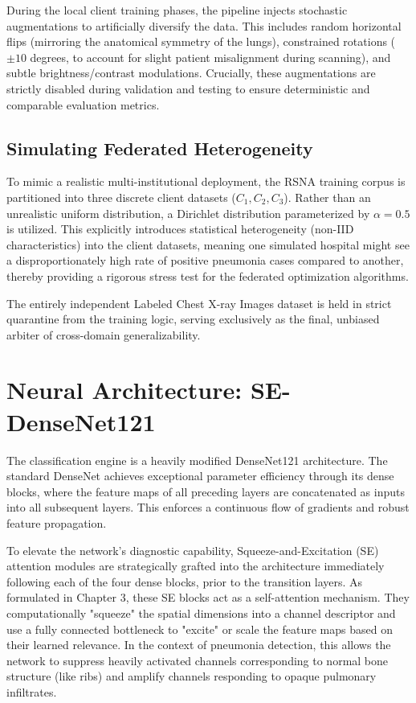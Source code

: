 \documentclass[12pt,a4paper]{report}
\begin{document}
During the local client training phases, the pipeline injects stochastic augmentations to artificially diversify the data. This includes random horizontal flips (mirroring the anatomical symmetry of the lungs), constrained rotations ($\pm 10$ degrees, to account for slight patient misalignment during scanning), and subtle brightness/contrast modulations. Crucially, these augmentations are strictly disabled during validation and testing to ensure deterministic and comparable evaluation metrics.

\subsection{Simulating Federated Heterogeneity}
To mimic a realistic multi-institutional deployment, the RSNA training corpus is partitioned into three discrete client datasets ($C_1, C_2, C_3$). Rather than an unrealistic uniform distribution, a Dirichlet distribution parameterized by $\alpha = 0.5$ is utilized. This explicitly introduces statistical heterogeneity (non-IID characteristics) into the client datasets, meaning one simulated hospital might see a disproportionately high rate of positive pneumonia cases compared to another, thereby providing a rigorous stress test for the federated optimization algorithms.

The entirely independent Labeled Chest X-ray Images dataset is held in strict quarantine from the training logic, serving exclusively as the final, unbiased arbiter of cross-domain generalizability.

\section{Neural Architecture: SE-DenseNet121}

The classification engine is a heavily modified DenseNet121 architecture. The standard DenseNet achieves exceptional parameter efficiency through its dense blocks, where the feature maps of all preceding layers are concatenated as inputs into all subsequent layers. This enforces a continuous flow of gradients and robust feature propagation.

To elevate the network's diagnostic capability, Squeeze-and-Excitation (SE) attention modules are strategically grafted into the architecture immediately following each of the four dense blocks, prior to the transition layers. As formulated in Chapter 3, these SE blocks act as a self-attention mechanism. They computationally "squeeze" the spatial dimensions into a channel descriptor and use a fully connected bottleneck to "excite" or scale the feature maps based on their learned relevance. In the context of pneumonia detection, this allows the network to suppress heavily activated channels corresponding to normal bone structure (like ribs) and amplify channels responding to opaque pulmonary infiltrates.
\end{document}
